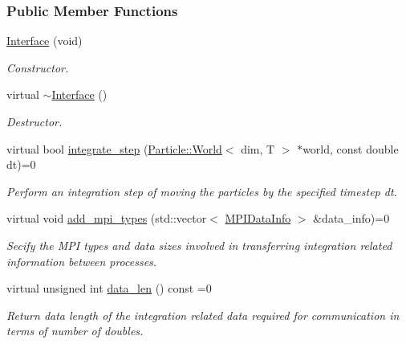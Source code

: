 \subsubsection*{Public Member Functions}
\begin{DoxyCompactItemize}
\item 
\hyperlink{classps__mmm_1_1_particle_1_1_integrator_1_1_interface_aba8ce6849a24ca46efd678530f742ad8}{Interface} (void)
\begin{DoxyCompactList}\small\item\em Constructor. \end{DoxyCompactList}\item 
virtual \hyperlink{classps__mmm_1_1_particle_1_1_integrator_1_1_interface_aba96035ee3e477c66cfd58ea80ee3586}{$\sim$\+Interface} ()
\begin{DoxyCompactList}\small\item\em Destructor. \end{DoxyCompactList}\item 
virtual bool \hyperlink{classps__mmm_1_1_particle_1_1_integrator_1_1_interface_ab5021dc21cc53a4b3f893b7c5310e1b0}{integrate\+\_\+step} (\hyperlink{classps__mmm_1_1_particle_1_1_world}{Particle\+::\+World}$<$ dim, T $>$ $\ast$world, const double dt)=0
\begin{DoxyCompactList}\small\item\em Perform an integration step of moving the particles by the specified timestep dt. \end{DoxyCompactList}\item 
virtual void \hyperlink{classps__mmm_1_1_particle_1_1_integrator_1_1_interface_aab598f85b5f1d9036122a35629f7b6e5}{add\+\_\+mpi\+\_\+types} (std\+::vector$<$ \hyperlink{classps__mmm_1_1_particle_1_1_m_p_i_data_info}{M\+P\+I\+Data\+Info} $>$ \&data\+\_\+info)=0
\begin{DoxyCompactList}\small\item\em Secify the M\+P\+I types and data sizes involved in transferring integration related information between processes. \end{DoxyCompactList}\item 
virtual unsigned int \hyperlink{classps__mmm_1_1_particle_1_1_integrator_1_1_interface_a66188d76381fde488b2a5b367123501c}{data\+\_\+len} () const  =0
\begin{DoxyCompactList}\small\item\em Return data length of the integration related data required for communication in terms of number of doubles. \end{DoxyCompactList}\item 

\end{DoxyCompactItemize}
